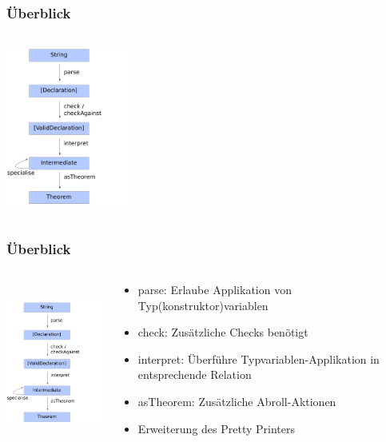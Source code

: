 \documentclass{beamer}
\begin{document}
\begin{frame}
\frametitle{Überblick}
\begin{columns}
\begin{column}{0.4\textwidth}
    \begin{center}
	\includegraphics[height=200px]{overview-free-theorems}
     \end{center}
\end{column}
\begin{column}{0.6\textwidth}
\end{column}
\end{columns}
\end{frame}

\begin{frame}
\frametitle{Überblick}
\begin{columns}
\begin{column}{0.4\textwidth}
    \begin{center}
	\includegraphics[height=200px]{overview-free-theorems}
     \end{center}
\end{column}
\begin{column}{0.6\textwidth}
  \begin{itemize}[<+->]
    \item parse: Erlaube Applikation von Typ(konstruktor)variablen
    \item check: Zusätzliche Checks benötigt
    \item interpret: Überführe Typvariablen-Applikation in entsprechende Relation
    \item asTheorem: Zusätzliche Abroll-Aktionen
    \item Erweiterung des Pretty Printers
  \end{itemize}
\end{column}
\end{columns}
\end{frame}
\end{document}
